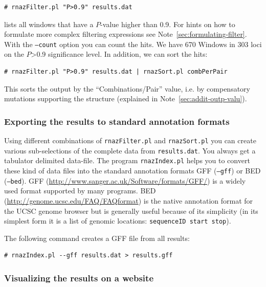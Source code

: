 \documentclass[11pt]{article}
\begin{document}
\begin{verbatim}
# rnazFilter.pl "P>0.9" results.dat
\end{verbatim}

lists all windows that have a $P$-value higher than 0.9.  For hints on how
to formulate more complex filtering expressions see
Note~\ref{sec:formulating-filter}. With the \texttt{--count} option you can
count the hits. We have 670 Windows in 303 loci on the $P$>0.9 significance
level. In addition, we can sort the hits:

\begin{verbatim}
# rnazFilter.pl "P>0.9" results.dat | rnazSort.pl combPerPair
\end{verbatim}

This sorts the output by the ``Combinations/Pair'' value, i.e. by
compensatory mutations supporting the structure (explained in
Note~\ref{sec:addit-outp-valu}).

\subsubsection{Exporting the results to standard annotation formats}
\label{sec:export-results-stand}

Using different combinations of \texttt{rnazFilter.pl} and
\texttt{rnazSort.pl} you can create various sub-selections of the complete
data from \texttt{results.dat}. You always get a tabulator delimited
data-file. The program \texttt{rnazIndex.pl} helps you to convert these
kind of data files into the standard annotation formats GFF
(\texttt{--gff}) or BED (\texttt{--bed}). GFF
(\url{http://www.sanger.ac.uk/Software/formats/GFF/}) is a widely used
format supported by many programs. BED
(\url{http://genome.ucsc.edu/FAQ/FAQformat}) is the native annotation
format for the UCSC genome browser but is generally useful because of its
simplicity (in its simplest form it is a list of genomic locations:
\texttt{sequenceID start stop}).

The following command creates a GFF file from all results:

\begin{verbatim}
# rnazIndex.pl --gff results.dat > results.gff
\end{verbatim}

\subsubsection{Visualizing the results on a website}
\label{sec:website}
\end{document}
